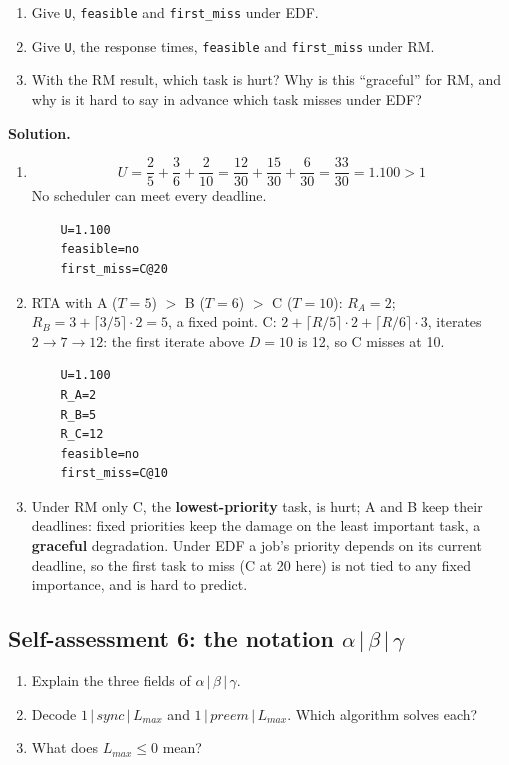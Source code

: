 \begin{enumerate}
    \item Give \texttt{U}, \texttt{feasible} and \texttt{first\_miss} under EDF.
    \item Give \texttt{U}, the response times, \texttt{feasible} and \texttt{first\_miss} under RM.
    \item With the RM result, which task is hurt? Why is this ``graceful'' for RM, and why is it hard to say in advance which task misses under EDF?
\end{enumerate}

\textbf{Solution.}
\begin{enumerate}
    \item \[
    U = \frac{2}{5} + \frac{3}{6} + \frac{2}{10} = \frac{12}{30} + \frac{15}{30} + \frac{6}{30} = \frac{33}{30} = 1.100 > 1
    \]
    No scheduler can meet every deadline.
\begin{verbatim}
    U=1.100
    feasible=no
    first_miss=C@20
\end{verbatim}
    \item RTA with A ($T = 5$) $>$ B ($T = 6$) $>$ C ($T = 10$): $R_A = 2$; $R_B = 3 + \lceil 3/5 \rceil \cdot 2 = 5$, a fixed point. C: $2 + \lceil R/5 \rceil \cdot 2 + \lceil R/6 \rceil \cdot 3$, iterates $2 \to 7 \to 12$: the first iterate above $D = 10$ is 12, so C misses at 10.
\begin{verbatim}
    U=1.100
    R_A=2
    R_B=5
    R_C=12
    feasible=no
    first_miss=C@10
\end{verbatim}
    \item Under RM only C, the \textbf{lowest-priority} task, is hurt; A and B keep their deadlines: fixed priorities keep the damage on the least important task, a \textbf{graceful} degradation. Under EDF a job's priority depends on its current deadline, so the first task to miss (C at 20 here) is not tied to any fixed importance, and is hard to predict.
\end{enumerate}

\subsection*{Self-assessment 6: the notation $\alpha \,|\, \beta \,|\, \gamma$}
\begin{enumerate}
    \item Explain the three fields of $\alpha \,|\, \beta \,|\, \gamma$.
    \item Decode $1 \,|\, \textit{sync} \,|\, L_{max}$ and $1 \,|\, \textit{preem} \,|\, L_{max}$. Which algorithm solves each?
    \item What does $L_{max} \le 0$ mean?
\end{enumerate}

